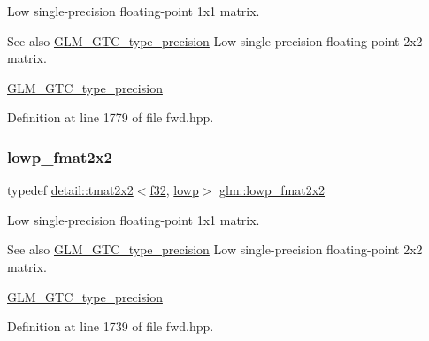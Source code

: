 Low single-\/precision floating-\/point 1x1 matrix. \begin{DoxySeeAlso}{See also}
\hyperlink{group__gtc__type__precision}{G\+L\+M\+\_\+\+G\+T\+C\+\_\+type\+\_\+precision} Low single-\/precision floating-\/point 2x2 matrix. 

\hyperlink{group__gtc__type__precision}{G\+L\+M\+\_\+\+G\+T\+C\+\_\+type\+\_\+precision} 
\end{DoxySeeAlso}


Definition at line 1779 of file fwd.\+hpp.

\mbox{\label{group__gtc__type__precision_ga99367a30c64035d7e7f76410105d10e3}} 
\subsubsection{\texorpdfstring{lowp\+\_\+fmat2x2}{lowp\_fmat2x2}}
{\footnotesize\ttfamily typedef \hyperlink{structglm_1_1detail_1_1tmat2x2}{detail\+::tmat2x2}$<$\hyperlink{group__gtc__type__precision_ga0ec999b57f5330d9021256e96038df04}{f32}, \hyperlink{namespaceglm_a0f04f086094c747d227af4425893f545ae161af3fc695e696ce3bf69f7332bc2d}{lowp}$>$ \hyperlink{group__gtc__type__precision_ga99367a30c64035d7e7f76410105d10e3}{glm\+::lowp\+\_\+fmat2x2}}

Low single-\/precision floating-\/point 1x1 matrix. \begin{DoxySeeAlso}{See also}
\hyperlink{group__gtc__type__precision}{G\+L\+M\+\_\+\+G\+T\+C\+\_\+type\+\_\+precision} Low single-\/precision floating-\/point 2x2 matrix. 

\hyperlink{group__gtc__type__precision}{G\+L\+M\+\_\+\+G\+T\+C\+\_\+type\+\_\+precision} 
\end{DoxySeeAlso}


Definition at line 1739 of file fwd.\+hpp.

\mbox{\label{group__gtc__type__precision_ga01c5c29a6cee22c3e75de25c98dbecc9}} 
